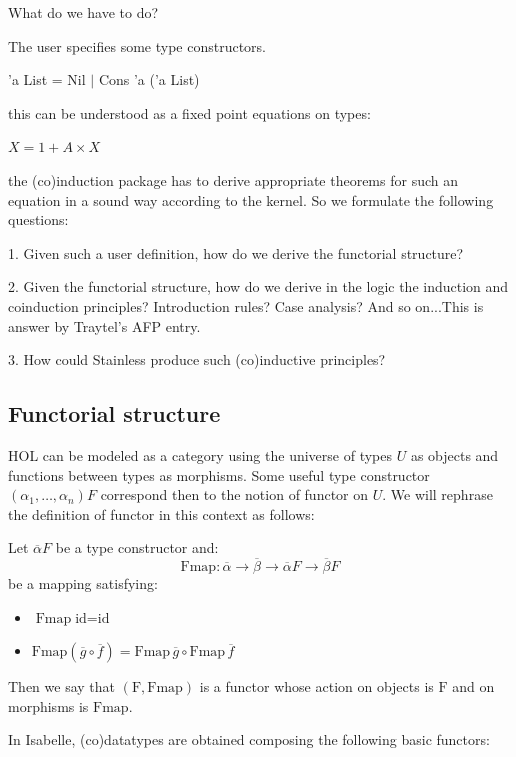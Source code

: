 What do we have to do?

The user specifies some type constructors. 

'a List = Nil $|$ Cons 'a ('a List) 

this can be understood as a fixed point equations on types:

$X = 1 + A \times X$

the (co)induction package has to derive appropriate theorems for such an equation in a sound way according to the  kernel. So we formulate the following questions:

1. Given such a user definition, how do we derive the functorial 
structure?

2. Given the functorial structure, how do we derive in the logic the
induction and coinduction principles? Introduction rules? Case analysis?
And so on...This is answer by Traytel's AFP entry.

3. How could Stainless produce such (co)inductive principles?

\subsection{Functorial structure}

HOL can be modeled as a category using the universe of types $U$ as objects and functions between types as morphisms. Some useful type constructor $(\alpha_1,\ldots,\alpha_n)F$ correspond then to the notion of functor on $U$. We will rephrase the definition of functor in this context as follows:

\begin{definition}
	Let $\overline{\alpha}F$ be a type constructor and: $$\text{Fmap}: \overline{\alpha} \to \overline{\beta} \to \overline{\alpha} F \to \overline{\beta} F$$ be a mapping satisfying: 
	
	\begin{itemize}
		\item $\text{Fmap} \; \text{id} = \text{id}$
		\item $\text{Fmap} (\overline{g} \circ \overline{f}) = \text{Fmap} \, \overline{g} \circ \text{Fmap} \, \overline{f}$
	\end{itemize}
	
	Then we say that $(\text{F}, \text{Fmap})$ is a functor whose action on objects is $\text{F}$ and on morphisms is $\text{Fmap}$.
\end{definition}

In Isabelle, (co)datatypes are obtained composing the following basic functors:

